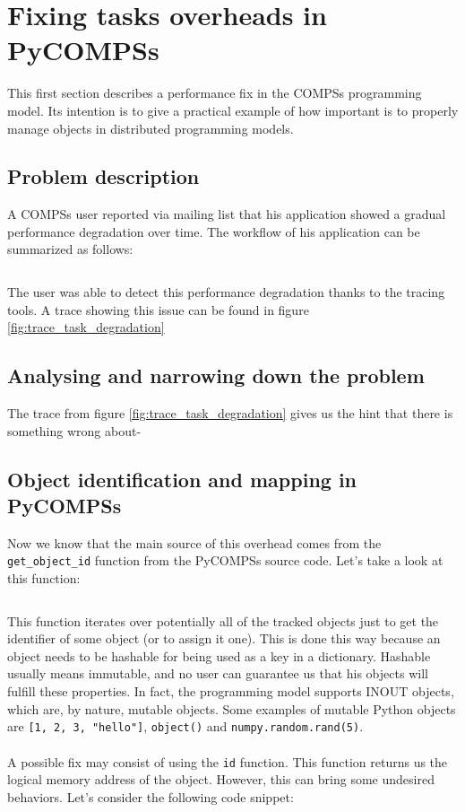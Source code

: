 \newpage
\section{Fixing tasks overheads in PyCOMPSs}
\label{sec:task_overhead}
This first section describes a performance fix in the COMPSs programming model. Its intention is to give a practical example of how important is to properly manage objects in distributed programming models.

\subsection{Problem description}
A COMPSs user reported via mailing list that his application showed a gradual performance degradation over time. The workflow of his application can be summarized as follows:

\inputminted{python}{applications/TASK_OVERHEAD/main.py}

The user was able to detect this performance degradation thanks to the tracing tools. A trace showing this issue can be found in figure \ref{fig:trace_task_degradation}


\subsection{Analysing and narrowing down the problem}
The trace from figure \ref{fig:trace_task_degradation} gives us the hint that there is something wrong about-

\subsection{Object identification and mapping in PyCOMPSs}
Now we know that the main source of this overhead comes from the \verb|get_object_id| function from the PyCOMPSs source code. Let's take a look at this function:

\inputminted{python}{snippets/get_object_id_old.py}

This function iterates over potentially all of the tracked objects just to get the identifier of some object (or to assign it one). This is done this way because an object needs to be hashable for being used as a key in a dictionary. Hashable usually means immutable, and no user can guarantee us that his objects will fulfill these properties. In fact, the programming model supports INOUT objects, which are, by nature, mutable objects. Some examples of mutable Python objects are \verb|[1, 2, 3, "hello"]|, \verb|object()| and \verb|numpy.random.rand(5)|.\\
\\
A possible fix may consist of using the \verb|id| function. This function returns us the logical memory address of the object. However, this can bring some undesired behaviors. Let's consider the following code snippet:


